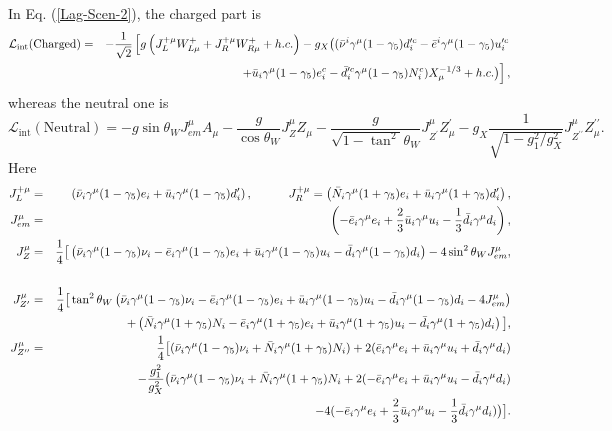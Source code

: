 \documentclass{ws-ijmpa}
\begin{document}
In Eq. (\ref{Lag-Scen-2}), the charged part is
\begin{eqnarray}
\mathcal{L}_{\text{int}}(\text{Charged})&=&-\frac{1}{\sqrt{2}}\left[g\left(J_{L}^{+\mu}W_{L \mu}^{+}+J_{R}^{+\mu}W_{R \mu}^{+}+ h.c.\right)-g_{X}\big((\bar{\nu}^{i}\gamma^{\mu}(1-\gamma_{5})d_{i}^{\prime c}-\bar{e}^{i}\gamma^{\mu}(1-\gamma_{5})u_{i}^{\prime c}\right. \notag \\
&&\left.+\bar{u}_{i}\gamma^{\mu}(1-\gamma_{5})e_{i}^{ c}-\bar{d}^{\prime c}_{i}\gamma^{\mu}(1-\gamma_{5})N_{i}^{c})X_{\mu}^{-1/3}+h.c.\big)\right]\label{charged-Lag2},
\end{eqnarray}
whereas the neutral one is
\begin{equation}
\mathcal{L}_{\text{int}} (\text{Neutral})= -g\sin\theta_WJ^{\mu}_{em}A_{\mu}-\frac{g}{\cos{\theta_W}}J_{Z}^{\mu}Z_{\mu}-\frac{g}{\sqrt{1-\tan^{2}}\theta_W}J_{Z^{\prime}}^{\mu}Z^{\prime}_{\mu}-g_{X}\frac{1}{\sqrt{1-g_{1}^2/g^{2}_{X}}}J_{Z^{\prime\prime}}^{\mu}Z^{\prime\prime}_{\mu}.\label{neutral-Lag2}
\end{equation}
Here
\begin{eqnarray}
J^{+ \mu}_{L}&=&\left(\bar{\nu}_{i}\gamma^{\mu}(1-\gamma_{5})e_{i} + \bar{u}_{i}\gamma^{\mu}(1-\gamma_{5})d^{\prime}_{i}\right),\quad\quad\quad J^{+ \mu}_{R}=\left(\bar{N}_{i}\gamma^{\mu}(1+\gamma_{5})e_{i} + \bar{u}_{i}\gamma^{\mu}(1+\gamma_{5})d^{\prime}_{i}\right)\label{current-2},\\
J^{\mu}_{em}&=&\left(-\bar{e}_{i}\gamma^{\mu}e_{i} + \frac{2}{3}\bar{u}_{i}\gamma^{\mu}u_{i}-\frac{1}{3}\bar{d}_{i}\gamma^{\mu}d_{i}\right)\label{current-3},\\
J_{Z}^{\mu} &=&\frac{1}{4}\big[\left(\bar{\nu}_{i}\gamma^{\mu}(1-\gamma_{5})\nu_{i}-\bar{e}_{i}\gamma^{\mu}(1-\gamma_{5})e_{i} +\bar{u}_{i}\gamma^{\mu}(1-\gamma_{5})u_{i} -\bar{d}_{i}\gamma^{\mu}(1-\gamma_{5}) d_{i}\right)-4\sin^{2}\theta_W J^{\mu}_{em},\notag\\
\label{current-4}\\
J_{Z^{\prime}}^{\mu}&=&\frac{1}{4}\big[\tan^{2}{\theta_W}\left(\bar{\nu}_{i}\gamma^{\mu}(1-\gamma_{5})\nu_{i}-\bar{e}_{i}\gamma^{\mu}(1-\gamma_{5})e_{i} +\bar{u}_{i}\gamma^{\mu}(1-\gamma_{5})u_{i} -\bar{d}_{i}\gamma^{\mu}(1-\gamma_{5}) d_{i}-4 J^{\mu}_{em}\right)\notag \\
&&+\left(\bar{N}_{i}\gamma^{\mu}(1+\gamma_{5})N_{i}-\bar{e}_{i}\gamma^{\mu}(1+\gamma_{5})e_{i} +\bar{u}_{i}\gamma^{\mu}(1+\gamma_{5})u_{i} -\bar{d}_{i}\gamma^{\mu}(1+\gamma_{5}) d_{i}\right)\big]
\label{current-5},\\
J_{Z^{\prime\prime}}^{\mu}&=&\frac{1}{4}\big[(\bar{\nu}_{i}\gamma^{\mu}(1-\gamma_{5})\nu_{i}+\bar{N}_{i}\gamma^{\mu}(1+\gamma_{5})N_{i})+2(\bar{e}_{i}\gamma^{\mu}e_{i} +\bar{u}_{i}\gamma^{\mu}u_{i}+\bar{d}_{i}\gamma^{\mu} d_{i})\notag \\
&&-\frac{g^{2}_1}{g^{2}_X}\big(\bar{\nu}_{i}\gamma^{\mu}(1-\gamma_{5})\nu_{i}+\bar{N}_{i}\gamma^{\mu}(1+\gamma_{5})N_{i}+2(-\bar{e}_{i}\gamma^{\mu}e_{i} +\bar{u}_{i}\gamma^{\mu}u_{i}-\bar{d}_{i}\gamma^{\mu} d_{i})\nonumber \\
&&-4(-\bar{e}_{i}\gamma^{\mu}e_{i} +\frac{2}{3}\bar{u}_{i}\gamma^{\mu}u_{i}-\frac{1}{3}\bar{d}_{i}\gamma^{\mu} d_{i})\big)\big]\label{current-6}.
\end{eqnarray}
\end{document}
